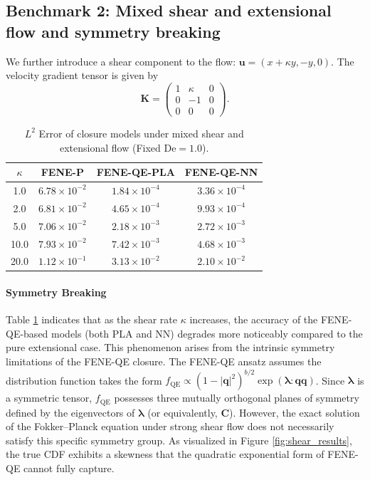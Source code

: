 \documentclass[preprint,12pt]{elsarticle}
\begin{document}
\subsection{Benchmark 2: Mixed shear and extensional flow and symmetry breaking}
We further introduce a shear component to the flow: $\bm{u}=(x+\kappa y,-y,0)$. The velocity gradient tensor is given by
\begin{equation}
    \bm{K}=
    \begin{pmatrix}
        1 & \kappa & 0 \\
        0 & -1 & 0 \\
        0 & 0 & 0
    \end{pmatrix}.
\end{equation}

\begin{table}[htbp]
    \centering
    \caption{$L^2$ Error of closure models under mixed shear and extensional flow (Fixed $\mathrm{De}=1.0$).}
    \label{tab:error}
    \begin{tabular}{cccc}
        \toprule
        $\kappa$ & \textbf{FENE-P} & \textbf{FENE-QE-PLA} & \textbf{FENE-QE-NN}\\
        \midrule
        1.0 & $6.78 \times 10^{-2}$ & $1.84 \times 10^{-4}$ & $3.36 \times 10^{-4}$\\
        2.0 & $6.81 \times 10^{-2}$ & $4.65 \times 10^{-4}$ & $9.93 \times 10^{-4}$\\
        5.0 & $7.06 \times 10^{-2}$ & $2.18 \times 10^{-3}$ & $2.72 \times 10^{-3}$\\
        10.0 & $7.93 \times 10^{-2}$ & $7.42 \times 10^{-3}$ & $4.68 \times 10^{-3}$\\
        20.0 & $1.12 \times 10^{-1}$ & $3.13 \times 10^{-2}$ & $2.10 \times 10^{-2}$\\
        \bottomrule
    \end{tabular}
\end{table}

\paragraph{Symmetry Breaking}
Table \ref{tab:error} indicates that as the shear rate $\kappa$ increases, the accuracy of the FENE-QE-based models (both PLA and NN) degrades more noticeably compared to the pure extensional case. This phenomenon arises from the intrinsic symmetry limitations of the FENE-QE closure.
The FENE-QE ansatz assumes the distribution function takes the form $f_{\text{QE}} \propto (1-|\bm{q}|^2)^{b/2}\exp(\bm{\lambda}:\bm{q}\bm{q})$. Since $\bm{\lambda}$ is a symmetric tensor, $f_{\text{QE}}$ possesses three mutually orthogonal planes of symmetry defined by the eigenvectors of $\bm{\lambda}$ (or equivalently, $\bm{C}$). However, the exact solution of the Fokker--Planck equation under strong shear flow does not necessarily satisfy this specific symmetry group. As visualized in Figure \ref{fig:shear_results}, the true CDF exhibits a skewness that the quadratic exponential form of FENE-QE cannot fully capture.
\end{document}
